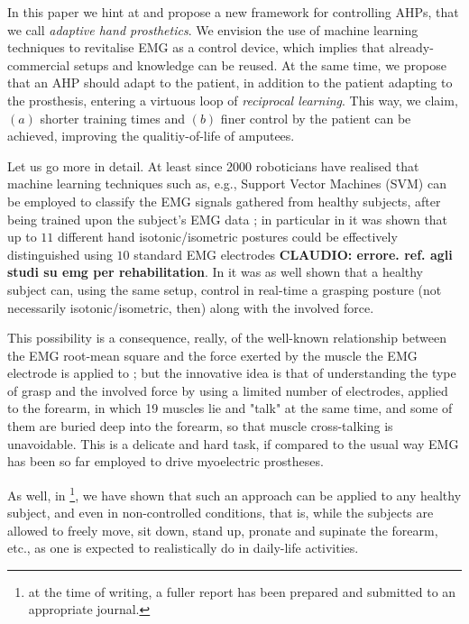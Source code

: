 In this paper we hint at and propose a new framework for controlling
AHPs, that we call \emph{adaptive hand prosthetics}. We envision the
use of machine learning techniques to revitalise EMG as a control
device, which implies that already-commercial setups and knowledge can
be reused. At the same time, we propose that an AHP should adapt to
the patient, in addition to the patient adapting to the prosthesis,
entering a virtuous loop of \emph{reciprocal learning}. This way, we
claim, $(a)$ shorter training times and $(b)$ finer control by the
patient can be achieved, improving the qualitiy-of-life of amputees.

Let us go more in detail. At least since 2000 roboticians have
realised that machine learning techniques such as, e.g., Support
Vector Machines (SVM) can be employed to classify the EMG signals
gathered from healthy subjects, after being trained upon the subject's
EMG data \cite{smagt,dunlop}; in particular in \cite{smagt} it was
shown that up to $11$ different hand isotonic/isometric postures could
be effectively distinguished using $10$ standard EMG electrodes
\textbf{CLAUDIO: errore. ref. agli studi su emg per rehabilitation}. In
\cite{2008.ICRA,2008.BioCyb} it was as well shown that a healthy
subject can, using the same setup, control in real-time a grasping
posture (not necessarily isotonic/isometric, then) along with the
involved force.

This possibility is a consequence, really, of the well-known
relationship between the EMG root-mean square and the force exerted by
the muscle the EMG electrode is applied to \cite{deluca}; but the
innovative idea is that of understanding the type of grasp and the
involved force by using a limited number of electrodes, applied to the
forearm, in which 19 muscles lie and "talk" at the same time, and some
of them are buried deep into the forearm, so that muscle cross-talking
is unavoidable. This is a delicate and hard task, if compared to the
usual way EMG has been so far employed to drive myoelectric
prostheses.

As well, in \cite{2008.GNB} \footnote{at the time of writing, a fuller
report has been prepared and submitted to an appropriate journal.}, we
have shown that such an approach can be applied to any healthy
subject, and even in non-controlled conditions, that is, while the
subjects are allowed to freely move, sit down, stand up, pronate and
supinate the forearm, etc., as one is expected to realistically do in
daily-life activities.


